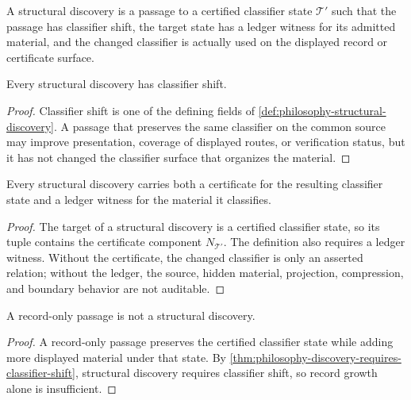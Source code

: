 \begin{definition}
\label{def:philosophy-structural-discovery}
A structural discovery is a passage to a certified classifier state
$\mathcal{T}'$ such that the passage has classifier shift, the target
state has a ledger witness for its admitted material, and the changed
classifier is actually used on the displayed record or certificate
surface.
\end{definition}

\begin{theorem}
\label{thm:philosophy-discovery-requires-classifier-shift}
Every structural discovery has classifier shift.
\end{theorem}
\begin{proof}
Classifier shift is one of the defining fields of
\autoref{def:philosophy-structural-discovery}. A passage that preserves
the same classifier on the common source may improve presentation,
coverage of displayed routes, or verification status, but it has not
changed the classifier surface that organizes the material.
\end{proof}

\begin{theorem}
\label{thm:philosophy-discovery-requires-certificate-ledger}
Every structural discovery carries both a certificate for the resulting
classifier state and a ledger witness for the material it classifies.
\end{theorem}
\begin{proof}
The target of a structural discovery is a certified classifier state, so
its tuple contains the certificate component $N_{\mathcal{T}'}$. The
definition also requires a ledger witness. Without the certificate, the
changed classifier is only an asserted relation; without the ledger, the
source, hidden material, projection, compression, and boundary behavior
are not auditable.
\end{proof}

\begin{corollary}
\label{cor:philosophy-record-growth-not-discovery-classifier}
A record-only passage is not a structural discovery.
\end{corollary}
\begin{proof}
A record-only passage preserves the certified classifier state while
adding more displayed material under that state. By
\autoref{thm:philosophy-discovery-requires-classifier-shift},
structural discovery requires classifier shift, so record growth
alone is insufficient.
\end{proof}

